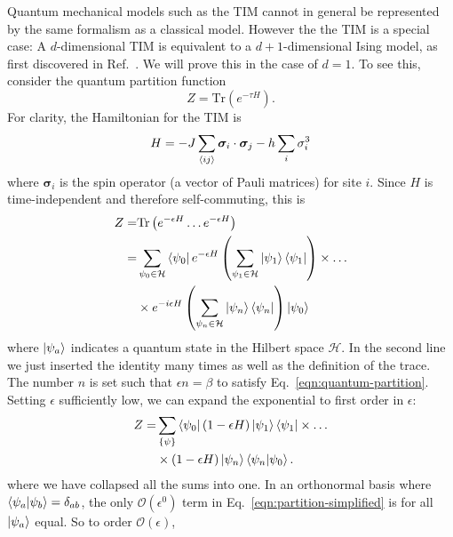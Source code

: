 \documentclass[
  amsmath,
  amssymb,
  aps,
  twocolumn,
  nofootinbib,
  nolongbibliography,
  floatfix,
]{revtex4-2}
\newcommand{\parens}[1]{\left ( #1 \right )}
\begin{document}
Quantum mechanical models such as the TIM cannot in general be represented by the same formalism as a classical model. However the the TIM is a special case: A $d$-dimensional TIM is equivalent to a $d+1$-dimensional Ising model, as first discovered in Ref.~\cite{schultz64two}. We will prove this in the case of $d=1$. To see this, consider the quantum partition function
\begin{equation}
  Z = \mathrm{Tr}\parens{e^{-\tau H}}.
  \label{eqn:quantum-partition}
\end{equation}
For clarity, the Hamiltonian for the TIM is
\begin{equation}
  H = -J \sum_{\braket{ij}}\bm \sigma_i \cdot \bm \sigma_j - h \sum_i\sigma_i^3
\end{equation}
where $\bm \sigma_i$ is the spin operator (a vector of Pauli matrices) for site $i$. Since $H$ is time-independent and therefore self-commuting, this is 
\begin{equation}
  \begin{split}
    Z =& \mathrm{Tr}\parens{e^{-\epsilon H}\dots e^{-\epsilon H}}\\
     =& \sum_{\psi_0\in\mathcal{H}}\bra{\psi_0}e^{-\epsilon H}\parens{\sum_{\psi_1\in\mathcal{H}}\ket{\psi_1}\bra{\psi_1}}\times\dots\\
     &\times e^{-i\epsilon H}\parens{\sum_{\psi_n\in\mathcal{H}}\ket{\psi_n}\bra{\psi_n}}\ket{\psi_0}
  \end{split}
\end{equation}
where $\ket{\psi_a}$ indicates a quantum state in the Hilbert space $\mathcal{H}$. In the second line we just inserted the identity many times as well as the definition of the trace. The number $n$ is set such that $\epsilon n = \beta$ to satisfy Eq.~\ref{eqn:quantum-partition}. Setting $\epsilon$ sufficiently low, we can expand the exponential to first order in $\epsilon$:
\begin{equation}
  \begin{split}
    Z =& \sum_{\{\psi\}}\bra{\psi_0}(1 - \epsilon H)\ket{\psi_1}\bra{\psi_1}\times\dots\\
    &\times (1 - \epsilon H)\ket{\psi_n}\braket{\psi_n|\psi_0}.
  \end{split}
  \label{eqn:partition-simplified}
\end{equation}
where we have collapsed all the sums into one. In an orthonormal basis where $\braket{\psi_a|\psi_b} = \delta_{ab}$, the only $\mathcal{O}(\epsilon^0)$ term in Eq.~\ref{eqn:partition-simplified} is for all $\ket{\psi_a}$ equal. So to order $\mathcal{O}(\epsilon)$,
\end{document}
